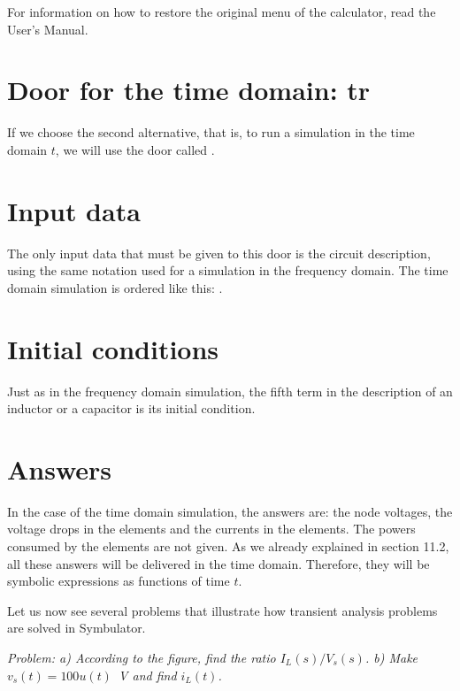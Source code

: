 For information on how to restore the original menu of the
calculator, read the User's Manual.

\section{Door for the time domain: tr}

If we choose the second alternative, that is, to run a simulation in
the time domain $t$, we will use the door called
.

\section{Input data}

The only input data that must be given to this door is the circuit
description, using the same notation used for a simulation in the
frequency domain. The time domain simulation is ordered like this:
.

\section{Initial conditions}

Just as in the frequency domain simulation, the fifth term in the
description of an inductor or a capacitor is its initial condition.

\section{Answers}

In the case of the time domain simulation, the answers are: the node
voltages, the voltage drops in the elements and the currents in the
elements. The powers consumed by the elements are not given. As we
already explained in section 11.2, all these answers will be
delivered in the time domain. Therefore, they will be symbolic
expressions as functions of time $t$.

Let us now see several problems that illustrate how transient
analysis problems are solved in Symbulator.


\emph{Problem: a) According to the figure, find the ratio
$I_L(s)/V_s(s)$. b) Make $v_s(t) = 100u(t)$~V and find $i_L(t)$.}

